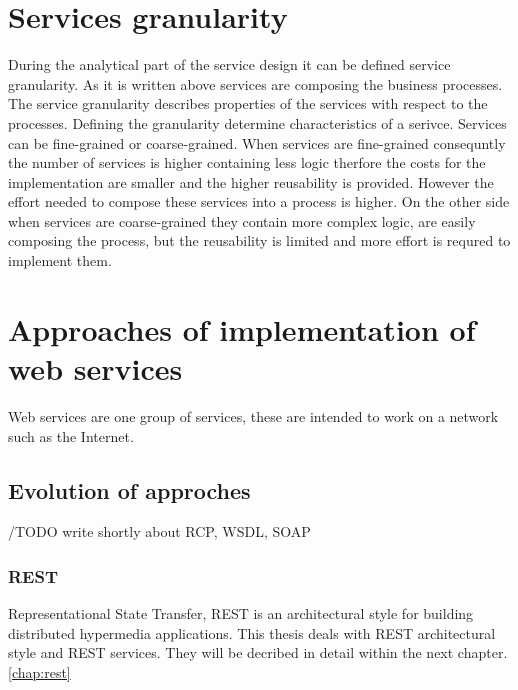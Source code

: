
\section{Services granularity}
\label{sec:granularity}
During the analytical part of the service design it can be defined service granularity. As it is written above services are composing the business processes. The service granularity describes properties of the services with respect to the processes. Defining the granularity determine characteristics of a serivce. Services can be fine-grained or coarse-grained.
When services are fine-grained consequntly the number of services is higher containing less logic therfore the costs for the implementation are smaller and the higher reusability is provided. However the effort needed to compose these services into a process is higher. 
On the other side when services are coarse-grained they contain more complex logic, are easily composing the process, but the reusability is limited and more effort is requred to implement them.

\section{Approaches of implementation of web services}
Web services are one group of services, these are intended to work on a network such as the Internet.

\subsection{Evolution of approches}
 
/TODO write shortly about RCP, WSDL, SOAP
 
\subsubsection{REST}

Representational State Transfer, REST is an architectural style for building distributed hypermedia applications. This thesis deals with REST architectural style and REST services. They will be decribed in detail within the next chapter. \ref{chap:rest}



    
